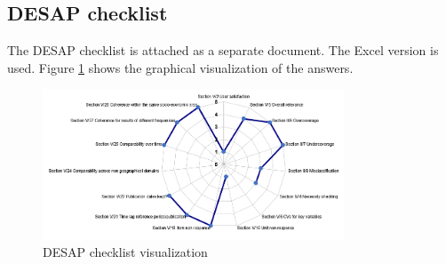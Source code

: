 \documentclass[12pt,a4paper,paper=a4,oneside,titlepage,pdftex]{scrartcl}
\begin{document}
\subsection{DESAP checklist}
The DESAP checklist is attached as a separate document. The Excel version is used. Figure \ref{fig:desap} shows the graphical visualization of the answers.

\begin{figure}[h!]
    \centering
    \includegraphics[width=0.8\textwidth]{figures/desap-graph.PNG}
    \caption{DESAP checklist visualization}
    \label{fig:desap}
\end{figure}
\end{document}
